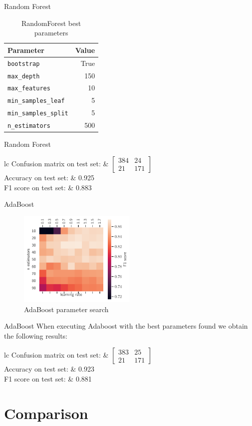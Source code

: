 \documentclass[aspectratio=169]{beamer}
\newcommand{\fresults}[3]{
\begin{table}[H]
\centering
\begin{tabular}{lc}
Confusion matrix on test set: & \( \begin{bmatrix} #1 \end{bmatrix} \) \\
    \addlinespace[0.5em]
    Accuracy on test set: & #2 \\
    F1 score on test set: & #3
\end{tabular}
\end{table}
}
\begin{document}
\begin{frame}{Random Forest}
\begin{table}[H]
\centering
\caption{RandomForest best parameters}
\begin{tabular}{lr}
\toprule
Parameter & Value \\
\midrule
\texttt{bootstrap} & True \\
\texttt{max\_depth} & 150 \\
\texttt{max\_features} & 10 \\
\texttt{min\_samples\_leaf} & 5 \\
\texttt{min\_samples\_split} & 5 \\
\texttt{n\_estimators} & 500 \\
\bottomrule
\end{tabular}
\end{table}
\end{frame}

\begin{frame}{Random Forest}
\fresults{ 384 &  24 \\ 21 & 171 }{0.925}{0.883}
\end{frame}

\begin{frame}{AdaBoost}
\begin{figure}[H]
\centering
\includegraphics[width=0.5\textwidth]{boosting}
\caption{AdaBoost parameter search}%
\label{fig:boosting}
\end{figure}

\end{frame}
\begin{frame}{AdaBoost}
When executing Adaboost with the best parameters found we obtain the following results:

\fresults{ 383 &  25 \\ 21 & 171 }{0.923}{0.881}
\end{frame}

\section{Comparison}
\end{document}
